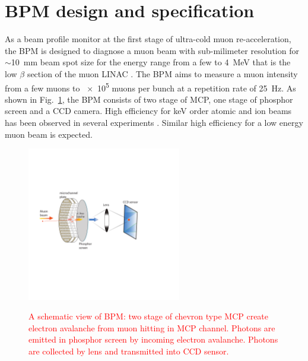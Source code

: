 \documentclass[preprint,3p,twocolumn]{elsarticle}
\begin{document}
\section{BPM design and specification}

As a beam profile monitor at the first stage of ultra-cold muon re-acceleration, the BPM is designed to diagnose a muon beam with %
sub-milimeter resolution for $\sim$\SI{10}{\mm} beam spot size for the energy range from a few to \SI{4}{\MeV} that is the low $\beta$ section of the muon LINAC \cite{IH}.
The BPM aims to measure a muon intensity from a few muons to \num{e5} muons per bunch at a repetition rate of \SI{25}{\hertz}. %
As shown in Fig.~\ref{fig:BPM_scheme}, the BPM consists of two stage of MCP, one stage of phosphor screen and a CCD camera.
High efficiency for \si{\keV} order atomic and ion beams has been observed in several experiments \cite{MCP_efficiency, MCP_efficiency1}. Similar high efficiency for a low energy muon beam is expected. 
\begin{figure}
\begin{center}
\vspace{-2.5cm}
\includegraphics[width=0.6\textwidth, height=0.6\textwidth]{figure/bpm_v3.pdf}
\vspace{-3cm}
\caption{\textcolor{red}{A schematic view of BPM: two stage of chevron type MCP create electron avalanche from muon hitting in MCP channel.
Photons are emitted in phosphor screen by incoming electron avalanche.
Photons are collected by lens and transmitted into CCD sensor.
}  
}
\vspace{-0.5cm}
\label{fig:BPM_scheme}
\end{center} \end{figure}
\end{document}
